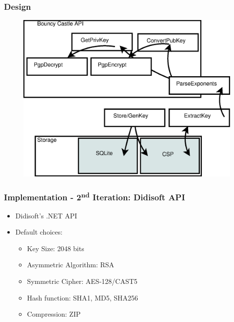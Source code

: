 \documentclass{beamer}
\begin{document}
\begin{frame}
\frametitle{Design}

\begin{figure}
\includegraphics[scale=0.4]{Diagram1}
\end{figure}

\end{frame}


\begin{frame}
\frametitle{Implementation - 2\textsuperscript{nd} Iteration: Didisoft API}
\begin{itemize}
\item Didisoft's .NET API
\item Default choices: 

\begin{itemize}
\item Key Size: 2048 bits \cite{p1}
\item Asymmetric Algorithm: RSA
\item Symmetric Cipher: AES-128/CAST5
\item Hash function: SHA1, MD5, SHA256
\item Compression: ZIP
\end{itemize}
\end{itemize}

\end{frame}

\end{document}
